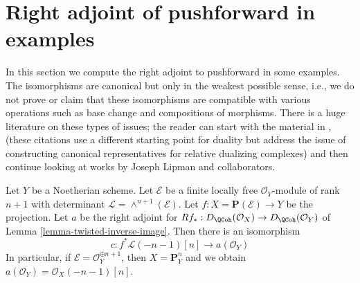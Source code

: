 \section{Right adjoint of pushforward in examples}
\label{section-examples}

\noindent
In this section we compute the right adjoint to pushforward in
some examples. The isomorphisms are canonical but only in the weakest
possible sense, i.e., we do not prove or claim that these isomorphisms are
compatible with various operations such as base change and compositions
of morphisms. There is a huge literature on these types of issues; the reader
can start with the material in \cite{RD}, \cite{Conrad-GD}
(these citations use a different starting point for duality but address the
issue of constructing canonical representatives for relative dualizing
complexes) and then continue looking at works by
Joseph Lipman and collaborators.

\begin{lemma}
\label{lemma-upper-shriek-P1}
Let $Y$ be a Noetherian scheme. Let $\mathcal{E}$ be a finite locally
free $\mathcal{O}_Y$-module of rank $n + 1$ with determinant
$\mathcal{L} = \wedge^{n + 1}(\mathcal{E})$.
Let $f : X = \mathbf{P}(\mathcal{E}) \to Y$ be the projection.
Let $a$ be the right adjoint for
$Rf_* : D_\QCoh(\mathcal{O}_X) \to D_\QCoh(\mathcal{O}_Y)$ of
Lemma \ref{lemma-twisted-inverse-image}.
Then there is an isomorphism
$$
c : f^*\mathcal{L}(-n - 1)[n] \longrightarrow a(\mathcal{O}_Y)
$$
In particular, if $\mathcal{E} = \mathcal{O}_Y^{\oplus n + 1}$, then
$X = \mathbf{P}^n_Y$ and we obtain
$a(\mathcal{O}_Y) = \mathcal{O}_X(-n - 1)[n]$.
\end{lemma}

